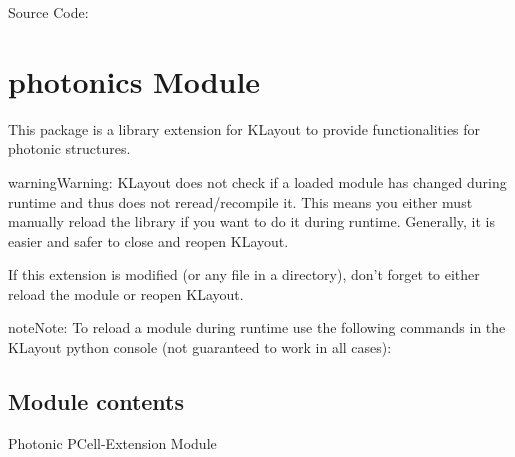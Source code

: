 \documentclass[a4paper,10pt,english]{sphinxmanual}
\begin{document}
Source Code: {\hyperref[\detokenize{source_code/cleanerslave_source:cssource}]{}}


\section{photonics Module}
\label{\detokenize{photonics/photonics:photonics-module}}\label{\detokenize{photonics/photonics::doc}}
This package is a library extension for KLayout to provide functionalities for photonic structures.

\begin{sphinxadmonition}{warning}{Warning:}
KLayout does not check if a loaded module has changed during runtime and thus does not reread/recompile it.
This means you either must manually reload the library if you want to do it during runtime. Generally, it is easier and
safer to close and reopen KLayout.

If this extension is modified (or any file in a  directory), don’t forget to either reload the module or
reopen KLayout.

\begin{sphinxadmonition}{note}{Note:}
To reload a module during runtime use the following commands in the KLayout python console (not guaranteed to work in all cases):

\begin{sphinxVerbatim}[commandchars=\\\{\}]
   
 
\end{sphinxVerbatim}
\end{sphinxadmonition}
\end{sphinxadmonition}


\subsection{Module contents}
\label{\detokenize{photonics/photonics:module-kppc.photonics}}\label{\detokenize{photonics/photonics:module-contents}}
Photonic PCell-Extension Module
\end{document}
